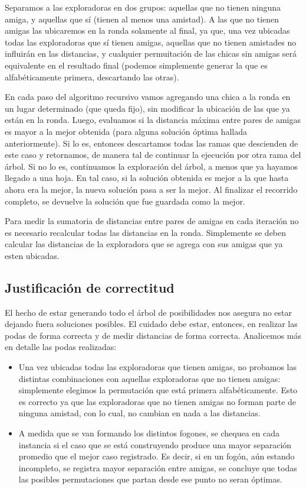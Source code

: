 Separamos a las exploradoras en dos grupos: aquellas que no tienen ninguna amiga, y aquellas que sí (tienen al menos una amistad). A las que no tienen amigas las ubicaremos en la ronda solamente al final, ya que, una vez ubicadas todas las exploradoras que sí tienen amigas, aquellas que no tienen amistades no influirán en las distancias, y cualquier permuitación de las chicas sin amigas será equivalente en el resultado final (podemos simplemente generar la que es alfabéticamente primera, descartando las otras).

En cada paso del algoritmo recursivo vamos agregando una chica a la ronda en un lugar determinado (que queda fijo), sin modificar la ubicación de las que ya están en la ronda. Luego, evaluamos si la distancia máxima entre pares de amigas es mayor a la mejor obtenida (para alguna solución óptima hallada anteriormente). Si lo es, entonces descartamos todas las ramas que descienden de este caso y retornamos, de manera tal de continuar la ejecución por otra rama del árbol. Si no lo es, continuamos la exploración del árbol, a menos que ya hayamos llegado a una hoja. En tal caso, si la solución obtenida es mejor a la que hasta ahora era la mejor, la nueva solución pasa a ser la mejor. Al finalizar el recorrido completo, se devuelve la solución que fue guardada como la mejor.

Para medir la sumatoria de distancias entre pares de amigas en cada iteración no es necesario recalcular todas las distancias en la ronda. Simplemente se deben calcular las distancias de la exploradora que se agrega con sus amigas que ya esten ubicadas.



\subsection{Justificación de correctitud}

El hecho de estar generando todo el árbol de posibilidades nos asegura no estar dejando fuera soluciones posibles. El cuidado debe estar, entonces, en realizar las podas de forma correcta y de medir distancias de forma correcta. Analicemos más en detalle las podas realizadas:

\begin{itemize}
 \item Una vez ubicadas todas las exploradoras que tienen amigas, no probamos las distintas combinaciones con aquellas exploradoras que no tienen amigas: simplemente elegimos la permutación que está primera alfabéticamente. Esto es correcto ya que las exploradoras que no tienen amigas no forman parte de ninguna amistad, con lo cual, no cambian en nada a las distancias.
 \item A medida que se van formando los distintos fogones, se chequea en cada instancia si el caso que se está construyendo produce una mayor separación promedio que el mejor caso registrado. Es decir, si en un fogón, aún estando incompleto, se registra mayor separación entre amigas, se concluye que todas las posibles permutaciones que partan desde ese punto no seran óptimas.
 \end{itemize}
 
